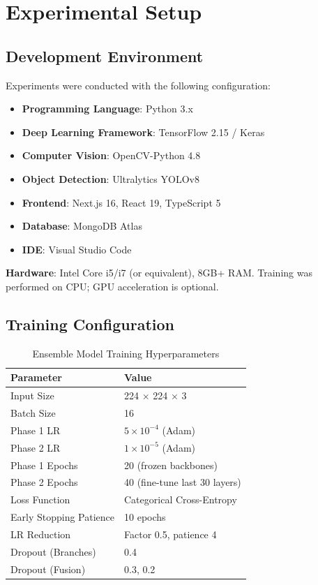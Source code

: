 \documentclass[conference]{IEEEtran}
\begin{document}
\section{Experimental Setup}

\subsection{Development Environment}

Experiments were conducted with the following configuration:
\begin{itemize}[leftmargin=*]
    \item \textbf{Programming Language}: Python 3.x
    \item \textbf{Deep Learning Framework}: TensorFlow 2.15 / Keras
    \item \textbf{Computer Vision}: OpenCV-Python 4.8
    \item \textbf{Object Detection}: Ultralytics YOLOv8
    \item \textbf{Frontend}: Next.js 16, React 19, TypeScript 5
    \item \textbf{Database}: MongoDB Atlas
    \item \textbf{IDE}: Visual Studio Code
\end{itemize}

\textbf{Hardware}: Intel Core i5/i7 (or equivalent), 8GB+ RAM. Training was performed on CPU; GPU acceleration is optional.

\subsection{Training Configuration}

\begin{table}[h]
\centering
\caption{Ensemble Model Training Hyperparameters}
\label{tab:hyperparams}
\begin{tabular}{ll}
\toprule
\textbf{Parameter} & \textbf{Value} \\
\midrule
Input Size & 224 $\times$ 224 $\times$ 3 \\
Batch Size & 16 \\
Phase 1 LR & $5 \times 10^{-4}$ (Adam) \\
Phase 2 LR & $1 \times 10^{-5}$ (Adam) \\
Phase 1 Epochs & 20 (frozen backbones) \\
Phase 2 Epochs & 40 (fine-tune last 30 layers) \\
Loss Function & Categorical Cross-Entropy \\
Early Stopping Patience & 10 epochs \\
LR Reduction & Factor 0.5, patience 4 \\
Dropout (Branches) & 0.4 \\
Dropout (Fusion) & 0.3, 0.2 \\
\bottomrule
\end{tabular}
\end{table}
\end{document}
